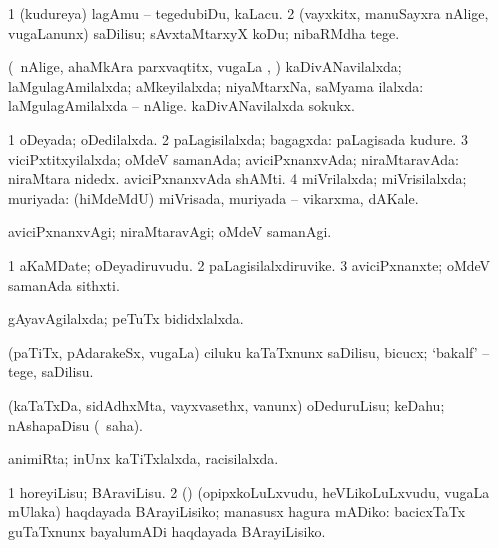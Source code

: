 \bentry
{} 
\gl{\sakirx}
\expl{}
\bmng
\bnum
\num{1} (kudureya) lagAmu -- tegedubiDu, kaLacu. 
\num{2} (vayxkitx, manuSayxra nAlige, \mo vugaLanunx) saDilisu; sAvxtaMtarxyX koDu; nibaRMdha tege. 
\enum
\emng
\eentry

\bentry
{} 
\gl{\gu}
\expl{}
\bmng
(\kanmu\ nAlige, ahaMkAra parxvaqtitx, \mo vugaLa \vi, \rUpa) kaDivANavilalxda; laMgulagAmilalxda; aMkeyilalxda; niyaMtarxNa, saMyama ilalxda:  laMgulagAmilalxda -- nAlige.  kaDivANavilalxda sokukx. 
\emng
\eentry

\bentry
{} 
\gl{\gu}
\expl{}
\bmng
\bnum
\num{1} oDeyada; oDedilalxda. 
\num{2} paLagisilalxda; bagagxda:  paLagisada kudure. 
\num{3} viciPxtitxyilalxda; oMdeV samanAda; aviciPxnanxvAda; niraMtaravAda:  niraMtara nidedx.  aviciPxnanxvAda shAMti. 
\num{4} miVrilalxda; miVrisilalxda; muriyada:  (hiMdeMdU) miVrisada, muriyada -- vikarxma, dAKale. 
\enum
\emng
\eentry

\bentry
{} 
\gl{\kirxvi}
\expl{}
\bmng
aviciPxnanxvAgi; niraMtaravAgi; oMdeV samanAgi. 
\emng
\eentry

\bentry
{} 
\gl{\nA}
\expl{}
\bmng
\bnum
\num{1} aKaMDate; oDeyadiruvudu. 
\num{2} paLagisilalxdiruvike. 
\num{3} aviciPxnanxte; oMdeV samanAda sithxti. 
\enum
\emng
\eentry

\bentry
{} 
\gl{\gu}
\expl{}
\bmng
gAyavAgilalxda; peTuTx bididxlalxda. 
\emng
\eentry

\bentry
{} 
\gl{\sakirx}
\expl{}
\bmng
(paTiTx, pAdarakeSx, \mo vugaLa) ciluku kaTaTxnunx saDilisu, bicucx; `bakalf' -- tege, saDilisu. 
\emng
\eentry

\bentry
{} 
\gl{\sakirx}
\bmng
(kaTaTxDa, sidAdhxMta, vayxvasethx, \mo vanunx) oDeduruLisu; keDahu; nAshapaDisu (\rUpa\ saha). 
\emng
\eentry

\bentry
{} 
\gl{\gu}
\bmng
animiRta; inUnx kaTiTxlalxda, racisilalxda. 
\emng
\eentry

\bentry
{} 
\gl{\sakirx}
\expl{}
\bmng
\bnum
\num{1} horeyiLisu; BAraviLisu. 
\num{2} (\AtAmx) (opipxkoLuLxvudu, heVLikoLuLxvudu, \mo vugaLa mUlaka) haqdayada BArayiLisiko; manasusx hagura mADiko:  bacicxTaTx guTaTxnunx bayalumADi haqdayada BArayiLisiko. 
\enum
\emng
\eentry

